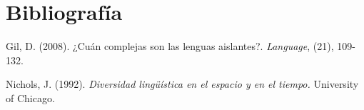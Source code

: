 \documentclass[12pt, a4paper, oneside]{report}
\begin{document}
        \section{Bibliografía}
            \begin{hangingpar}
                Gil, D. (2008). ¿Cuán complejas son las lenguas aislantes?. \emph{Language}, (21), 109-132.
            \end{hangingpar}

            \begin{hangingpar}
                Nichols, J. (1992). \emph{Diversidad lingüística en el espacio y en el tiempo.} University of
                Chicago.
            \end{hangingpar}
\end{document}
